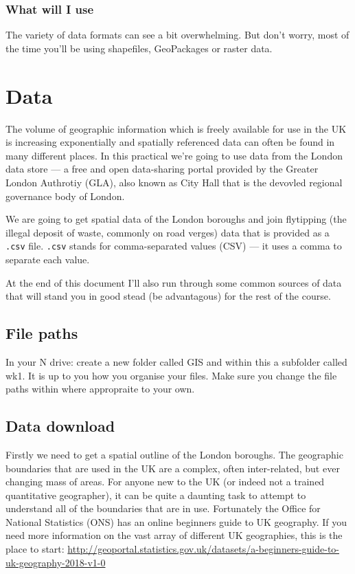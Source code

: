 \documentclass[]{book}
\begin{document}
\hypertarget{what-will-i-use}{%
\subsubsection{What will I use}\label{what-will-i-use}}

The variety of data formats can see a bit overwhelming. But don't worry, most of the time you'll be using shapefiles, GeoPackages or raster data.

\hypertarget{data}{%
\section{Data}\label{data}}

The volume of geographic information which is freely available for use in the UK is increasing exponentially and spatially referenced data can often be found in many different places. In this practical we're going to use data from the London data store --- a free and open data-sharing portal provided by the Greater London Authrotiy (GLA), also known as City Hall that is the devovled regional governance body of London.

We are going to get spatial data of the London boroughs and join flytipping (the illegal deposit of waste, commonly on road verges) data that is provided as a \texttt{.csv} file. \texttt{.csv} stands for comma-separated values (CSV) --- it uses a comma to separate each value.

At the end of this document I'll also run through some common sources of data that will stand you in good stead (be advantagous) for the rest of the course.

\hypertarget{file-paths}{%
\subsection{File paths}\label{file-paths}}

In your N drive: create a new folder called GIS and within this a subfolder called wk1. It is up to you how you organise your files. Make sure you change the file paths within where appropraite to your own.

\hypertarget{data-download}{%
\subsection{Data download}\label{data-download}}

Firstly we need to get a spatial outline of the London boroughs. The geographic boundaries that are used in the UK are a complex, often inter-related, but ever changing mass of areas. For anyone new to the UK (or indeed not a trained quantitative geographer), it can be quite a daunting task to attempt to understand all of the boundaries that are in use. Fortunately the Office for National Statistics (ONS) has an online beginners guide to UK geography. If you need more information on the vast array of different UK geographies, this is the place to start: \url{http://geoportal.statistics.gov.uk/datasets/a-beginners-guide-to-uk-geography-2018-v1-0}
\end{document}
